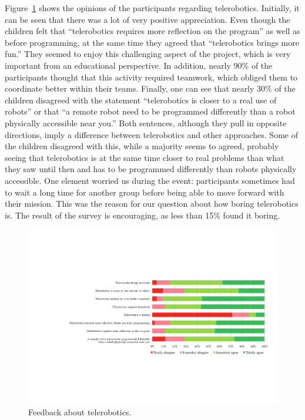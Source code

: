\documentclass{intech-journal}
\begin{document}
Figure~\ref{fig:tele} shows the opinions of the participants regarding telerobotics. 
Initially, it can be seen that there was a lot of very positive appreciation. 
Even though the children felt that ``telerobotics requires more reflection on the program'' as well as before programming, at the same time they agreed that ``telerobotics brings more fun.'' 
They seemed to enjoy this challenging aspect of the project, which is very important from an educational perspective. 
In addition, nearly 90\% of the participants thought that this activity required teamwork, which obliged them to coordinate better within their teams. 
Finally, one can see that nearly 30\% of the children disagreed with the statement ``telerobotics is closer to a real use of robots'' or that ``a remote robot need to be programmed differently than a robot physically accessible near you.''
Both sentences, although they pull in opposite directions, imply a difference between telerobotics and other approaches.
Some of the children disagreed with this, while a majority seems to agreed, probably seeing that telerobotics is at the same time closer to real problems than what they saw until then and has to be programmed differently than robots physically accessible.
One element worried us during the event: participants sometimes had to wait a long time for another group before being able to move forward with their mission. 
This was the reason for our question about how boring telerobotics is.
The result of the survey is encouraging, as less than 15\% found it boring.


\begin{figure}[ht]
 \centering
    \includegraphics[width=\columnwidth]{figures/telerobotics.pdf}
  \caption{Feedback about telerobotics.}
  \label{fig:tele} 
\end{figure}
\end{document}
